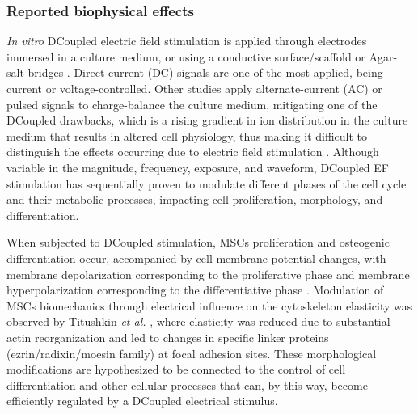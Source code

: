\subsubsection{Reported biophysical effects}
\textit{In vitro} \ac{DCoupled} electric field stimulation is applied through electrodes immersed in a culture medium, or using a conductive surface/scaffold or Agar-salt bridges \cite{Meng2013-mz}. Direct-current (\acs{DC}) signals are one of the most applied, being current or voltage-controlled. Other studies apply alternate-current (\acs{AC}) or pulsed signals to charge-balance the culture medium, mitigating one of the DCoupled drawbacks, which is a rising gradient in ion distribution in the culture medium that results in altered cell physiology, thus making it difficult to distinguish the effects occurring due to electric field stimulation \cite{Meng2021-qn}. Although variable in the magnitude, frequency, exposure, and waveform, \ac{DCoupled} \ac{EF} stimulation has sequentially proven to modulate different phases of the cell cycle and their metabolic processes, impacting cell proliferation, morphology, and differentiation. 

When subjected to \ac{DCoupled} stimulation, \acs{MSCs} proliferation and osteogenic differentiation occur, accompanied by cell membrane potential changes, with membrane depolarization corresponding to the proliferative phase and membrane hyperpolarization corresponding to the differentiative phase \cite{Bhavsar2019-iz}. Modulation of \acs{MSCs} biomechanics through electrical influence on the cytoskeleton elasticity was observed by Titushkin \textit{et al.} \cite{Titushkin2009-gi}, where elasticity was reduced due to substantial actin reorganization and led to changes in specific linker proteins (ezrin/radixin/moesin family) at focal adhesion sites. These morphological modifications are hypothesized to be connected to the control of cell differentiation and other cellular processes that can, by this way, become efficiently regulated by a \acs{DCoupled} electrical stimulus.

